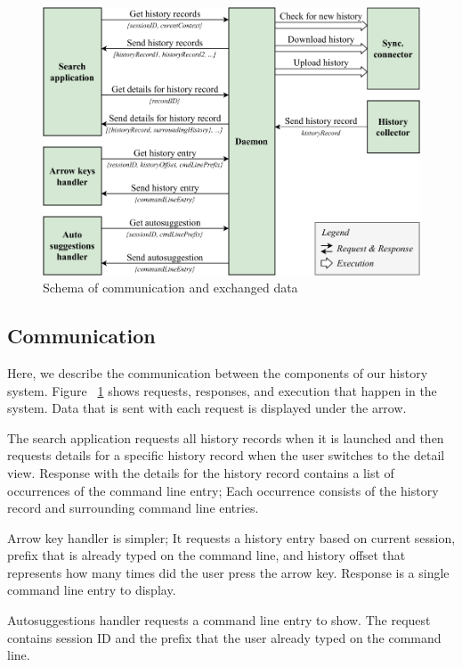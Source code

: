 \documentclass[thesis=M,english]{FITthesis}[2012/10/20]
\newcommand{\tmpframe}[1]{\fbox{#1}}
\renewcommand{\tmpframe}[1]{#1}
\let\myRef\ref
\renewcommand\ref{\unskip~\myRef}
\begin{document}
\begin{figure}
\centering
  \tmpframe{\includegraphics[width=\linewidth]{figures/design/thesis-design-api.pdf}}
  \caption{Schema of communication and exchanged data}
  \label{design-api}
\end{figure}


\subsection{Communication}

Here, we describe the communication between the components of our history system. Figure \ref{design-api} shows requests, responses, and execution that happen in the system. Data that is sent with each request is displayed under the arrow. 

The search application requests all history records when it is launched and then requests details for a specific history record when the user switches to the detail view. Response with the details for the history record contains a list of occurrences of the command line entry; Each occurrence consists of the history record and surrounding command line entries.

Arrow key handler is simpler; It requests a history entry based on current session, prefix that is already typed on the command line, and history offset that represents how many times did the user press the arrow key. Response is a single command line entry to display.

Autosuggestions handler requests a command line entry to show. The request contains session ID and the prefix that the user already typed on the command line.
\end{document}
